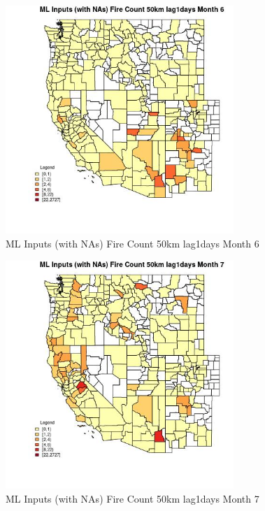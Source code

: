 \begin{figure} 
\centering  
\includegraphics[width=0.77\textwidth]{Code_Outputs/Report_ML_input_PM25_Step4_part_f_de_duplicated_aves_prioritize_24hr_obswNAs_CountyFire_Count_50km_lag1daysmedianMonth6.jpg} 
\caption{\label{fig:Report_ML_input_PM25_Step4_part_f_de_duplicated_aves_prioritize_24hr_obswNAsCountyFire_Count_50km_lag1daysmedianMonth6}ML Inputs (with NAs) Fire Count 50km lag1days Month 6} 
\end{figure} 
 

\begin{figure} 
\centering  
\includegraphics[width=0.77\textwidth]{Code_Outputs/Report_ML_input_PM25_Step4_part_f_de_duplicated_aves_prioritize_24hr_obswNAs_CountyFire_Count_50km_lag1daysmedianMonth7.jpg} 
\caption{\label{fig:Report_ML_input_PM25_Step4_part_f_de_duplicated_aves_prioritize_24hr_obswNAsCountyFire_Count_50km_lag1daysmedianMonth7}ML Inputs (with NAs) Fire Count 50km lag1days Month 7} 
\end{figure} 
 

